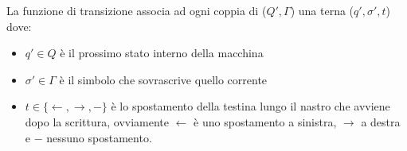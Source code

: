 La funzione di transizione associa ad ogni coppia di ($Q', \Gamma$) una terna ($q',\sigma',t$) dove:
\begin{itemize}
    \item $q'\in Q$ è il prossimo stato interno della macchina
    \item $\sigma' \in \Gamma$ è il simbolo che sovrascrive quello corrente
    \item $t \in \{ \leftarrow,\rightarrow, -  \}$ è lo spostamento della testina lungo il nastro che avviene dopo la scrittura,
    ovviamente $\leftarrow$ è uno spostamento a sinistra, $\rightarrow$ a destra e $-$ nessuno spostamento.
\end{itemize}








